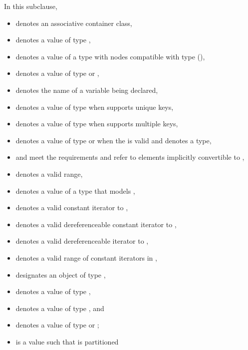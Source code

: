 \pnum
In this subclause,
\begin{itemize}
\item
{} denotes an associative container class,
\item
{} denotes a value of type ,
\item
{} denotes a value of a type with nodes compatible with type
 (),
\item
{} denotes a value of type  or ,
\item
{} denotes the name of a variable being declared,
\item
{} denotes a value of type 
when  supports unique keys,
\item
{} denotes a value of type 
when  supports multiple keys,
\item
{} denotes a value of type  or 
when the 
 is valid
and denotes a type,
\item
{} and 
meet the  requirements and refer to elements
implicitly convertible to
,
\item
{} denotes a valid range,
\item
{} denotes a value of a type 
that models ,
\item
{} denotes a valid constant iterator to ,
\item
{} denotes a valid dereferenceable constant iterator to ,
\item
{} denotes a valid dereferenceable iterator to ,
\item
\tcode{[q1, q2)} denotes a valid range of constant iterators in ,
\item
{} designates an object of type ,
\item
{} denotes a value of type ,
\item
{} denotes a value of type , and
\item
{} denotes a value of type  or ;
\item
{} is a value such that  is partitioned

\end{itemize}
